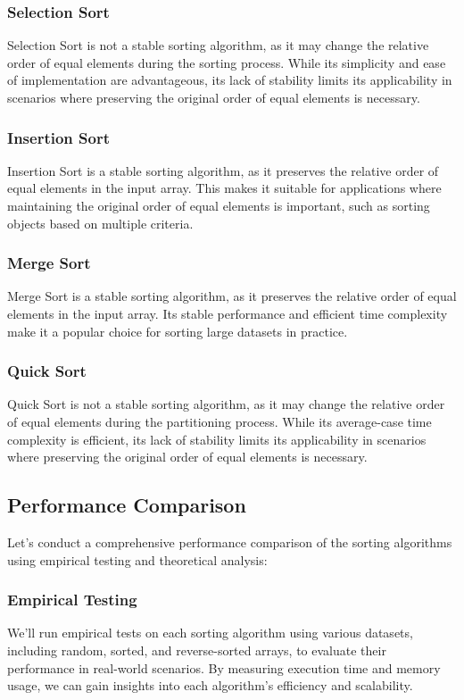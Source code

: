 \documentclass{article}
\begin{document}
\subsubsection{Selection Sort}
Selection Sort is not a stable sorting algorithm, as it may change the relative order of equal elements during the sorting process. While its simplicity and ease of implementation are advantageous, its lack of stability limits its applicability in scenarios where preserving the original order of equal elements is necessary.

\subsubsection{Insertion Sort}
Insertion Sort is a stable sorting algorithm, as it preserves the relative order of equal elements in the input array. This makes it suitable for applications where maintaining the original order of equal elements is important, such as sorting objects based on multiple criteria.

\subsubsection{Merge Sort}
Merge Sort is a stable sorting algorithm, as it preserves the relative order of equal elements in the input array. Its stable performance and efficient time complexity make it a popular choice for sorting large datasets in practice.

\subsubsection{Quick Sort}
Quick Sort is not a stable sorting algorithm, as it may change the relative order of equal elements during the partitioning process. While its average-case time complexity is efficient, its lack of stability limits its applicability in scenarios where preserving the original order of equal elements is necessary.

\subsection{Performance Comparison}
Let's conduct a comprehensive performance comparison of the sorting algorithms using empirical testing and theoretical analysis:

\subsubsection{Empirical Testing}
We'll run empirical tests on each sorting algorithm using various datasets, including random, sorted, and reverse-sorted arrays, to evaluate their performance in real-world scenarios. By measuring execution time and memory usage, we can gain insights into each algorithm's efficiency and scalability.
\end{document}

